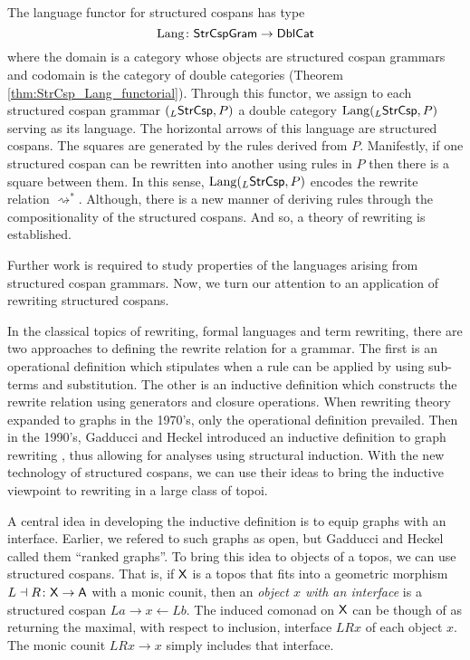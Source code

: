 \documentclass{amsart}
\begin{document}
The language functor for structured cospans has
type
$$ \mathrm{Lang} \colon \mathsf{StrCspGram} \to \mathsf{DblCat} $$ where the
domain is a category whose objects are structured
cospan grammars and codomain is the category of
double categories (Theorem
\ref{thm:StrCsp_Lang_functorial}). Through this
functor, we assign to each structured cospan
grammar $ ( _L\mathsf{StrCsp},P ) $ a double category
$ \mathrm{Lang} (_L\mathsf{StrCsp}, P) $ serving as its
language. The horizontal arrows of this language
are structured cospans.  The squares are generated
by the rules derived from $ P $. Manifestly, if
one structured cospan can be rewritten into
another using rules in $ P $ then there is a
square between them.  In this sense,
$ \mathrm{Lang} (_L\mathsf{StrCsp} , P) $ encodes the rewrite
relation $ \rightsquigarrow^\ast $.  Although,
there is a new manner of deriving rules through
the compositionality of the structured cospans.
And so, a theory of rewriting is established.

Further work is required to study properties of
the languages arising from structured cospan
grammars. Now, we turn our attention to an
application of rewriting structured cospans.

In the classical topics of rewriting, formal
languages and term rewriting, there are two
approaches to defining the rewrite relation for a
grammar. The first is an operational definition
which stipulates when a rule can be applied by
using sub-terms and substitution.  The other is an
inductive definition which constructs the rewrite
relation using generators and closure
operations. When rewriting theory expanded to
graphs in the 1970's, only the operational
definition prevailed.  Then in the 1990's, Gadducci
and Heckel introduced an inductive definition to
graph rewriting
\cite{Gadd_IndGraphTrans}, thus allowing for
analyses using structural induction. With the new
technology of structured cospans, we can use their
ideas to bring the inductive viewpoint to
rewriting in a large class of topoi.

A central idea in developing the inductive
definition is to equip graphs with an
interface. Earlier, we refered to such graphs as
open, but Gadducci and Heckel called them ``ranked
graphs''.  To bring this idea to objects of a
topos, we can use structured cospans. That is, if
$ \mathsf{X} $ is a topos that fits into a geometric
morphism $ L \dashv R \colon \mathsf{X} \to \mathsf{A} $ with a
monic counit, then an \emph{object $ x $ with an
interface} is a structured cospan $ La \to x \gets
Lb$. The induced comonad on $ \mathsf{X} $ can be though
of as returning the maximal, with respect to
inclusion, interface $ LRx $ of each object $ x
$. The monic counit $ LRx \to x $ simply includes
that interface.
\end{document}
